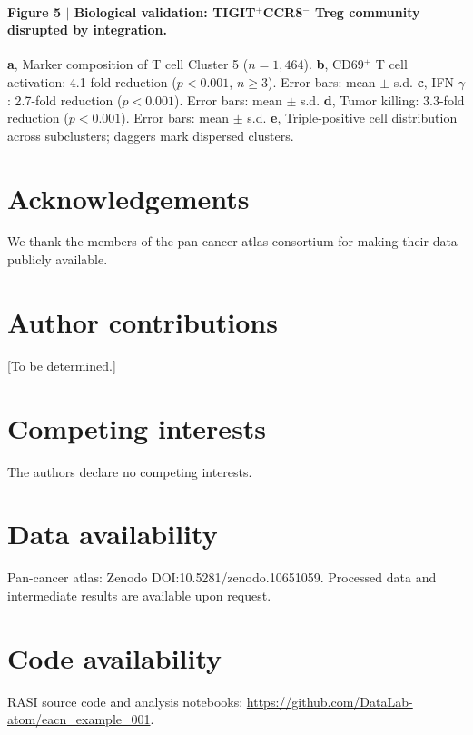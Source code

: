 \documentclass[10pt]{article}
\begin{document}
\paragraph{Figure 5 $|$ Biological validation: TIGIT$^+$CCR8$^-$ Treg community disrupted by integration.}
\textbf{a}, Marker composition of T cell Cluster 5 ($n = 1{,}464$).
\textbf{b}, CD69$^+$ T cell activation: 4.1-fold reduction ($p < 0.001$, $n \geq 3$). Error bars: mean $\pm$ s.d.
\textbf{c}, IFN-$\gamma$: 2.7-fold reduction ($p < 0.001$). Error bars: mean $\pm$ s.d.
\textbf{d}, Tumor killing: 3.3-fold reduction ($p < 0.001$). Error bars: mean $\pm$ s.d.
\textbf{e}, Triple-positive cell distribution across subclusters; daggers mark dispersed clusters.

\section*{Acknowledgements}
We thank the members of the pan-cancer atlas consortium for making their data publicly available.

\section*{Author contributions}
[To be determined.]

\section*{Competing interests}
The authors declare no competing interests.

\section*{Data availability}
Pan-cancer atlas: Zenodo DOI:10.5281/zenodo.10651059. Processed data and intermediate results are available upon request.

\section*{Code availability}
RASI source code and analysis notebooks: \url{https://github.com/DataLab-atom/eacn_example_001}.
\end{document}
